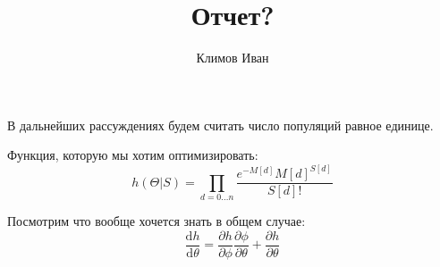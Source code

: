 \documentclass[10pt]{article}
\title{Отчет?}
\author{Климов Иван}
\date{}
\theoremstyle{plain}
\theoremstyle{remark}
\begin{document}
\maketitle

В дальнейших рассуждениях будем считать число популяций равное единице.

Функция, которую мы хотим оптимизировать:
\begin{equation*}
  h(\Theta | S) = \prod_{d = 0 \dotsc n} \frac{e^{-M[d]} M[d]^{S[d]}}{S[d]!}
\end{equation*}

Посмотрим что вообще хочется знать в общем случае:
\begin{equation*}
  \frac{\mathrm{d}h}{\mathrm{d}\theta} = \frac{\partial h}{\partial \phi} \frac{\partial \phi}{\partial \theta} + \frac{\partial h}{\partial \theta}
\end{equation*}
\end{document}
